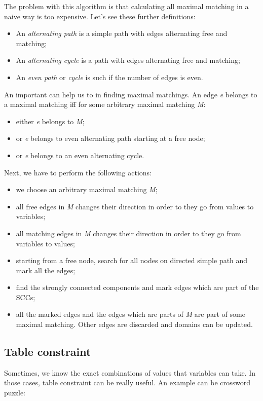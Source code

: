 \documentclass[10pt,a4paper]{article}
\begin{document}
The problem with this algorithm is that calculating all maximal matching in a
naive way is too expensive. Let's see these further definitions:

\begin{itemize}
    \item An \textit{alternating path} is a simple path with edges alternating
    free and matching;
    \item An \textit{alternating cycle} is a path with edges alternating free
    and matching;
    \item An \textit{even path} or \textit{cycle} is such if the number of edges
    is even.
\end{itemize}

An important can help us to in finding maximal matchings. An edge \textit{e}
belongs to a maximal matching iff for some arbitrary maximal matching
\textit{M}:

\begin{itemize}
    \item either \textit{e} belongs to \textit{M};
    \item or \textit{e} belongs to even alternating path starting at a free
    node;
    \item or \textit{e} belongs to an even alternating cycle.
\end{itemize}

Next, we have to perform the following actions:

\begin{itemize}
    \item we choose an arbitrary maximal matching \textit{M};
    \item all free edges in \textit{M} changes their direction in order to they
    go from values to variables;
    \item all matching edges in \textit{M} changes their direction in order to
    they go from variables to values;
    \item starting from a free node, search for all nodes on directed simple
    path and mark all the edges;
    \item find the strongly connected components and mark edges which are part
    of the SCCs;
    \item all the marked edges and the edges which are parts of \textit{M} are
    part of some maximal matching. Other edges are discarded and domains can be
    updated.
\end{itemize}

\subsection{Table constraint}
Sometimes, we know the exact combinations of values that variables can take.
In those cases, table constraint can be really useful. An example can be
crossword puzzle:
\end{document}
